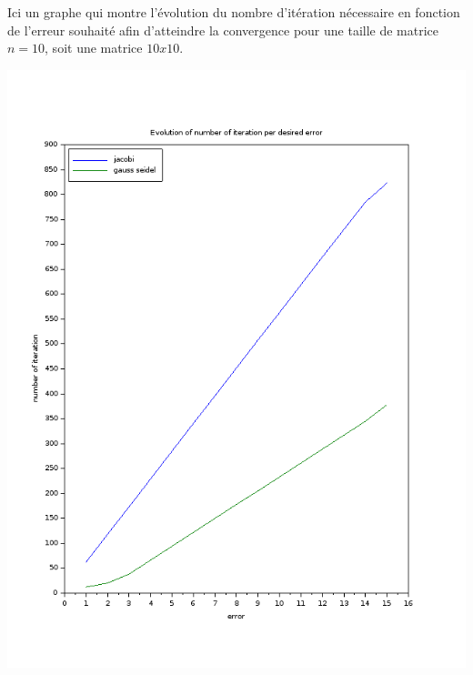 \documentclass[11pt]{article}
\begin{document}
Ici un graphe qui montre l'évolution du nombre d'itération nécessaire
en fonction de l'erreur souhaité afin d'atteindre la convergence pour
une taille de matrice $n = 10$, soit une matrice $10 x 10$.

\includegraphics[scale=0.5]{img/error.png}
\end{document}
